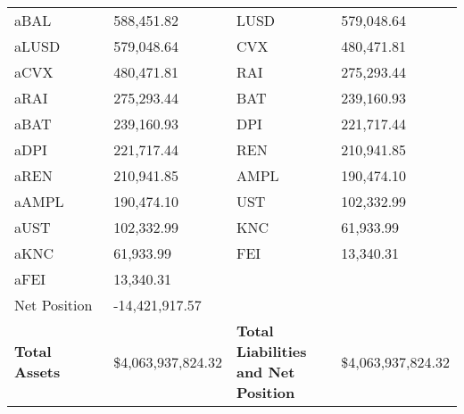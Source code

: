 \begin{longtable}{@{}p{0.25\linewidth}p{0.25\linewidth}p{0.25\linewidth}p{0.25\linewidth}@{}}
aBAL & 588,451.82 & LUSD &579,048.64 \\
aLUSD & 579,048.64 & CVX &480,471.81 \\
aCVX & 480,471.81 & RAI &275,293.44 \\
aRAI & 275,293.44 & BAT &239,160.93 \\
aBAT & 239,160.93 & DPI &221,717.44 \\
aDPI & 221,717.44 & REN &210,941.85 \\
aREN & 210,941.85 & AMPL &190,474.10 \\
aAMPL & 190,474.10 & UST &102,332.99 \\
aUST & 102,332.99 & KNC &61,933.99 \\
aKNC & 61,933.99 & FEI &13,340.31 \\
aFEI & 13,340.31 & & \\
Net Position & -14,421,917.57 & & \\

\midrule

\textbf{Total Assets} & \$4,063,937,824.32 & \textbf{Total Liabilities and Net Position} & \$4,063,937,824.32 \\

\bottomrule

\end{longtable}
